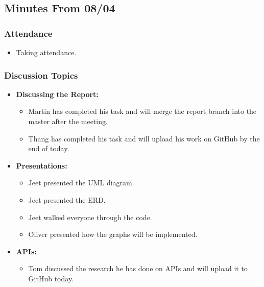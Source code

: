 \documentclass[12pt]{article}
\begin{document}
\hypertarget{minutes-from-0804}{%
\subsection{Minutes From 08/04}\label{minutes-from-0804}}

\hypertarget{attendance-2}{%
\subsubsection{Attendance}\label{attendance-2}}

\begin{itemize}
\tightlist
\item
  Taking attendance.
\end{itemize}

\hypertarget{discussion-topics-1}{%
\subsubsection{Discussion Topics}\label{discussion-topics-1}}

\begin{itemize}
\tightlist
\item
  \textbf{Discussing the Report:}

  \begin{itemize}
  \tightlist
  \item
    Martin has completed his task and will merge the report branch into
    the master after the meeting.
  \item
    Thang has completed his task and will upload his work on GitHub by
    the end of today.
  \end{itemize}
\item
  \textbf{Presentations:}

  \begin{itemize}
  \tightlist
  \item
    Jeet presented the UML diagram.
  \item
    Jeet presented the ERD.
  \item
    Jeet walked everyone through the code.
  \item
    Oliver presented how the graphs will be implemented.
  \end{itemize}
\item
  \textbf{APIs:}

  \begin{itemize}
  \tightlist
  \item
    Tom discussed the research he has done on APIs and will upload it to
    GitHub today.
  \end{itemize}
\end{itemize}
\end{document}
